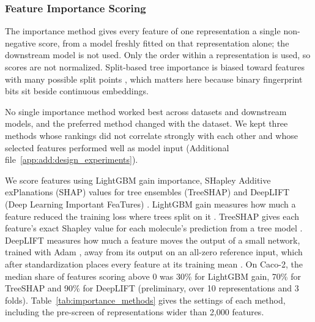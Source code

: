\subsubsection{Feature Importance Scoring}



The importance method gives every feature of one representation a single non-negative score, from a model freshly fitted on that representation alone; the downstream model is not used. Only the order within a representation is used, so scores are not normalized. Split-based tree importance is biased toward features with many possible split points \citep{Strobl2007}, which matters here because binary fingerprint bits sit beside continuous embeddings.

No single importance method worked best across datasets and downstream models, and the preferred method changed with the dataset. We kept three methods whose rankings did not correlate strongly with each other and whose selected features performed well as model input (Additional file~\ref{app:add:design_experiments}).


We score features using LightGBM gain importance, SHapley Additive exPlanations (SHAP) values for tree ensembles (TreeSHAP) and DeepLIFT (Deep Learning Important FeaTures) \citep{Shrikumar2017}. LightGBM gain measures how much a feature reduced the training loss where trees split on it \citep{ke2017lightgbm}. TreeSHAP gives each feature's exact Shapley value for each molecule's prediction from a tree model \citep{Lundberg2020}. DeepLIFT measures how much a feature moves the output of a small network, trained with Adam \citep{Kingma2015}, away from its output on an all-zero reference input, which after standardization places every feature at its training mean \citep{Shrikumar2017, Kokhlikyan2020, Ancona2018}. On Caco-2, the median share of features scoring above 0 was 30\% for LightGBM gain, 70\% for TreeSHAP and 90\% for DeepLIFT (preliminary, over 10 representations and 3 folds). Table~\ref{tab:importance_methods} gives the settings of each method, including the pre-screen of representations wider than 2,000 features.

